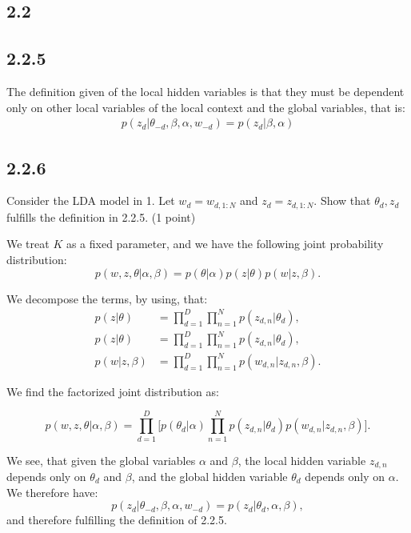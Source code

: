 \documentclass{article}
\begin{document}
\begin{multicols}{2}
    \section*{2.2}
    \subsection*{2.2.5} 
    The definition given of the local hidden variables is that they must be dependent
    only on other local variables of the local context and the global variables, that is:
    \begin{align}
        p(z_{d}|\theta_{-d}, \beta, \alpha, w_{-d}) = p(z_{d} | \beta, \alpha)
    \end{align}
    \subsection*{2.2.6}
    Consider the LDA model in 1. Let \(w_d = w_{d,1:N}\) and \(z_d = z_{d,1:N}\). Show that \(\theta_d, z_d\) fulfills the definition in 2.2.5. (1 point)\bigskip

    We treat $K$ as a fixed parameter, and we have the following joint probability distribution:
    \[
    p(w, z, \theta | \alpha, \beta) = p(\theta | \alpha) p(z | \theta) p(w | z, \beta).
    \]

    We decompose the terms, by using, that:
    \begin{align*}
    p(z | \theta) &= \prod_{d=1}^D \prod_{n=1}^N p(z_{d,n} | \theta_d), \\
    p(z | \theta) &= \prod_{d=1}^D \prod_{n=1}^N p(z_{d,n} | \theta_d), \\
    p(w | z, \beta) &= \prod_{d=1}^D \prod_{n=1}^N p(w_{d,n} | z_{d,n}, \beta).
    \end{align*}

    We find the factorized joint distribution as:

    \[
    p(w, z, \theta | \alpha, \beta) = \prod_{d=1}^D \Big[ p(\theta_d | \alpha) \prod_{n=1}^N p(z_{d,n} | \theta_d) p(w_{d,n} | z_{d,n}, \beta) \Big].
    \]

    We see, that given the global variables $\alpha$ and $\beta$, the local hidden variable $z_{d,n}$ depends only on $\theta_d$ and $\beta$, and the global hidden variable $\theta_d$ depends only on $\alpha$.
    We therefore have:
    \[
    p(z_{d} |\theta_{-d}, \beta, \alpha, w_{-d}) = p(z_{d} |\theta_d, \alpha, \beta),
    \]
    and therefore fulfilling the definition of 2.2.5.






\end{multicols}
\end{document}
